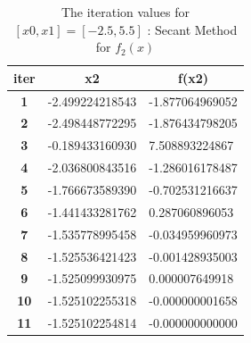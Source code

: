 \documentclass[a4paper, 12pt]{report}
\begin{document}
\begin{table}[h]
\centering
\begin{tabular}{|c|l|l|}
\hline
\textbf{iter} & \multicolumn{1}{c|}{\textbf{x2}} & \multicolumn{1}{c|}{\textbf{f(x2)}}  \\ \hline
\textbf{1}  & -2.499224218543 & -1.877064969052 \\ \hline
\textbf{2}  & -2.498448772295 & -1.876434798205 \\ \hline
\textbf{3}  & -0.189433160930 & 7.508893224867  \\ \hline
\textbf{4}  & -2.036800843516 & -1.286016178487 \\ \hline
\textbf{5}  & -1.766673589390 & -0.702531216637 \\ \hline
\textbf{6}  & -1.441433281762 & 0.287060896053  \\ \hline
\textbf{7}  & -1.535778995458 & -0.034959960973 \\ \hline
\textbf{8}    & -1.525536421423                  & \multicolumn{1}{c|}{-0.001428935003} \\ \hline
\textbf{9}  & -1.525099930975 & 0.000007649918  \\ \hline
\textbf{10} & -1.525102255318 & -0.000000001658 \\ \hline
\textbf{11} & -1.525102254814 & -0.000000000000 \\ \hline
\end{tabular}
\caption{The iteration values for $[x0,x1] = [-2.5,5.5]$ : Secant Method for $f_{2}(x)$}
\label{table:12}
\end{table}
\end{document}
